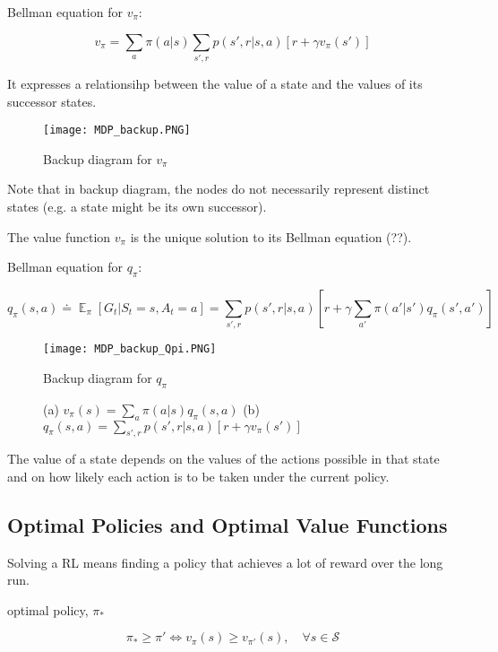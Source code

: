 \documentclass[lang=en,mode=geye,device=normal,color=blue,14pt]{elegantnote}
\DeclareMathOperator*{\E}{\mathbb{E}}
\DeclareMathOperator*{\1}{\mathbbm{1}}
\begin{document}
\begin{definition}
Bellman equation for $v_\pi$:

$$ v_\pi = \sum_a \pi(a|s) \sum_{s',r} p(s',r|s,a) [r+ \gamma v_\pi(s')] $$
\end{definition}

It expresses a relationsihp between the value of a state and the values of its successor states.

\begin{figure}[!h]
  \centering
  \texttt{[image: MDP\_backup.PNG]}
  \caption{Backup diagram for $v_\pi$}
  \label{fig:MDP_backup}
\end{figure}
Note that in backup diagram, the nodes do not necessarily represent distinct states (e.g. a state might be its own successor).

The value function $v_\pi$ is the unique solution to its Bellman equation (??).

\begin{definition}
Bellman equation for $q_\pi$:

$$ q_\pi(s,a) \doteq \E_\pi [G_t | S_t = s, A_t = a] = \sum_{s',r} p(s',r|s,a)[r+\gamma \sum_{a'} \pi(a'|s')q_\pi (s',a')] $$
\end{definition}

\begin{figure}[!h]
  \centering
  \texttt{[image: MDP\_backup\_Qpi.PNG]}
  \caption{Backup diagram for $q_\pi$}
  \label{fig:MDP_backup_qpi}
\end{figure}

\begin{figure}[!h]
    \centering
    \caption{ (a) $ v_\pi(s)=\sum_a \pi(a|s)q_\pi(s,a) $ (b) $ q_\pi(s,a)=\sum_{s',r}p(s',r|s,a)[r+\gamma v_\pi(s')] $ }
    \label{fig:MDPMDP}
\end{figure}
The value of a state depends on the values of the actions possible in that state and on how likely each action is to be taken under the current policy.

\subsection{Optimal Policies and Optimal Value Functions}

Solving a RL means finding a policy that achieves a lot of reward over the long run.

\begin{definition}
optimal policy, $\pi_*$

$$ \pi_* \geq \pi' \iff v_\pi(s) \geq v_{\pi'}(s), \quad \forall s \in \mathcal{S} $$
\end{definition}
\end{document}
